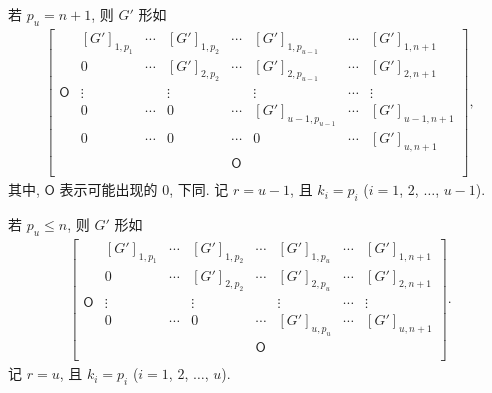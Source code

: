 \documentclass[../libro.tex]{subfiles}
\begin{document}
若 \(p_u = n + 1\),
则 \(G'\) 形如
\begin{align*}
    \begin{bmatrix}
        {}         & [G']_{1,p_1} & \cdots & [G']_{1,p_2} & \cdots     & [G']_{1,p_{u-1}}   & \cdots & [G']_{1,n+1}   \\
        {}         & 0            & \cdots & [G']_{2,p_2} & \cdots     & [G']_{2,p_{u-1}}   & \cdots & [G']_{2,n+1}   \\
        \mathsf{O} & \vdots       & {}     & \vdots       & {}         & \vdots             & \cdots & \vdots         \\
        {}         & 0            & \cdots & 0            & \cdots     & [G']_{u-1,p_{u-1}} & \cdots & [G']_{u-1,n+1} \\
        {}         & 0            & \cdots & 0            & \cdots     & 0                  & \cdots & [G']_{u,n+1}   \\
        {}         & {}           & {}     & {}           & \mathsf{O} & {}                 & {}     & {}             \\
    \end{bmatrix},
\end{align*}
其中, \(\mathsf{O}\) 表示可能出现的 \(0\), 下同.
记 \(r = u - 1\),
且 \(k_i = p_i\)
(\(i = 1\), \(2\), \(\dots\), \(u - 1\)).

若 \(p_u \leq n\),
则 \(G'\) 形如
\begin{align*}
    \begin{bmatrix}
        {}         & [G']_{1,p_1} & \cdots & [G']_{1,p_2} & \cdots     & [G']_{1,p_u} & \cdots & [G']_{1,n+1} \\
        {}         & 0            & \cdots & [G']_{2,p_2} & \cdots     & [G']_{2,p_u} & \cdots & [G']_{2,n+1} \\
        \mathsf{O} & \vdots       & {}     & \vdots       & {}         & \vdots       & \cdots & \vdots       \\
        {}         & 0            & \cdots & 0            & \cdots     & [G']_{u,p_u} & \cdots & [G']_{u,n+1} \\
        {}         & {}           & {}     & {}           & \mathsf{O} & {}           & {}     & {}           \\
    \end{bmatrix}.
\end{align*}
记 \(r = u\),
且 \(k_i = p_i\)
(\(i = 1\), \(2\), \(\dots\), \(u\)).
\end{document}
